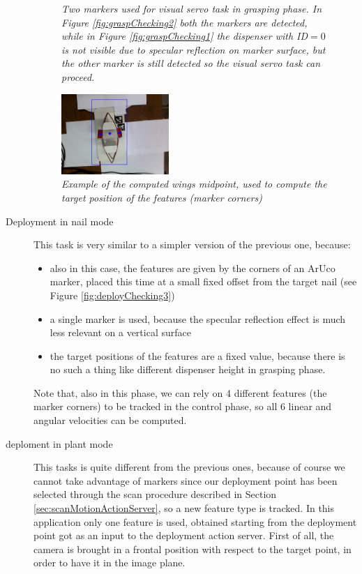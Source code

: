 \begin{description}
\begin{figure}
	\caption{\textit{Two markers used for visual servo task in grasping phase. In Figure \ref{fig:graspChecking2} both the markers are detected, while in Figure \ref{fig:graspChecking1} the dispenser with ID$=0$ is not visible due to specular reflection on marker surface, but the other marker is still detected so the visual servo task can proceed.}}
	\label{fig:twoMarkersControl}
\end{figure}


\begin{figure}
	\centering
	\includegraphics[width=0.4\textwidth]{Images/arm/depth_estimation_2.png}
	\caption{\textit{Example of the computed wings midpoint, used to compute the target position of the features (marker corners)}}
	\label{fig:computedFeatures}
\end{figure}

	\item[Deployment in nail mode] This task is very similar to a simpler version of the previous one, because:
	\begin{itemize}
		\item also in this case, the features are given by the corners of an ArUco marker, placed this time at a small fixed offset from the target nail (see Figure \ref{fig:deployChecking3})
		\item a single marker is used, because the specular reflection effect is much less relevant on a vertical surface 
		\item the target positions of the features are a fixed value, because there is no such a thing like different dispenser height in grasping phase.
	\end{itemize}
	Note that, also in this phase, we can rely on 4 different features (the marker corners) to be tracked in the control phase, so all 6 linear and angular velocities can be computed.
	
\item[deploment in plant mode] This tasks is quite different from the previous ones, because of course we cannot take advantage of markers since our deployment point has been selected through the scan procedure described in Section \ref{sec:scanMotionActionServer}, so a new feature type is tracked. In this application only one feature is used, obtained starting from the deployment point got as an input to the deployment action server. First of all, the camera is brought in a frontal position with respect to the target point, in order to have it in the image plane. 

	
\end{description}



